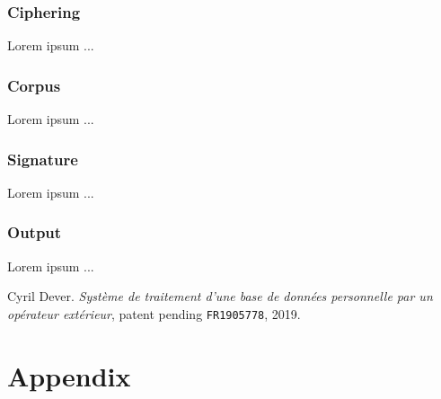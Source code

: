 \documentclass[twoside,twocolumn]{article}
\theoremstyle{definition}
\theoremstyle{remark}
\begin{document}
\subsubsection{Ciphering}

Lorem ipsum ... %

\subsubsection{Corpus}

Lorem ipsum ...

\subsubsection{Signature}

Lorem ipsum ...

\subsubsection{Output}

Lorem ipsum ...

\tableofcontents %


\begin{thebibliography}{99} %

Cyril Dever. \emph{Système de traitement d'une base de données personnelle par un opérateur extérieur}, patent pending \texttt{FR1905778}, 2019.

\end{thebibliography}


\onecolumn
\section*{Appendix}
\end{document}
